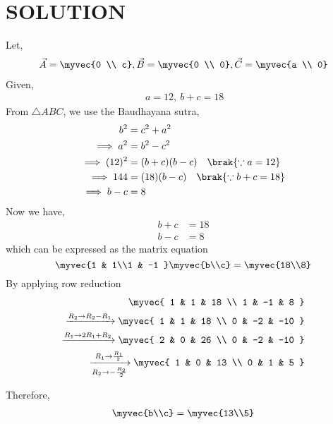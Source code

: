 \documentclass[journal,12pt,twocolumn]{IEEEtran}
\begin{document}
\section{SOLUTION}
 Let,
\begin{align}
\Vec{A}=\myvec{0 \\ c},
\Vec{B}=\myvec{0 \\ 0},
\Vec{C}=\myvec{a \\ 0}
\end{align}
 Given,
\begin{align}
\ a= 12,
\ b+c = 18
\end{align}
 From  $\triangle ABC$, we use the Baudhayana sutra,
\begin{align}
\ b^2 &=c^2+a^2
\\
\implies a^2 &=b^2-c^2
\\
\implies (12)^2 &=(b+c)(b-c) \quad \brak{\because  a = 12}
\\
\implies 144 &=(18)(b-c) \quad \brak{\because b+c = 18}
\\
\implies b-c &=8
\end{align}
 Now we have,
\begin{align}
b+c &=18
\\
b-c &=8
\end{align}
which can be expressed as the matrix equation
\begin{equation}
 \myvec{1 & 1\\1 & -1 }\myvec{b\\c} = \myvec{18\\8}
\end{equation}
By applying row reduction 
\begin{align}
\myvec{
1 & 1   & 18 
\\
1 & -1   & 8 
}
\\
  \xrightarrow{R_2\rightarrow R_2-R_1}
\myvec{
1 & 1   & 18
\\
0 & -2   & -10 
} 
\\
  \xrightarrow{R_1\rightarrow 2R_1+R_2} 
\myvec{
2 & 0   & 26 
\\
0 & -2   & -10 
}
\\
 \xrightarrow[R_2 \rightarrow -\frac{R_2}{2}]{R_1\rightarrow \frac{R_1}{2}} 
\myvec{
1 & 0   & 13 
\\
0 & 1   & 5 
}
\end{align}

Therefore,
\begin{align}
\myvec{b\\c} = \myvec{13\\5}
\end{align}
\end{document}
